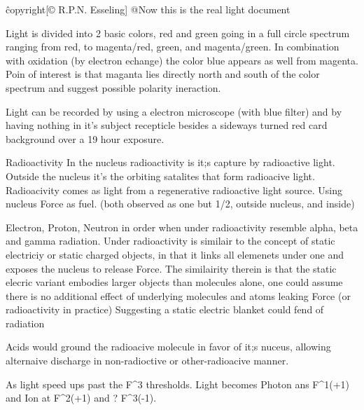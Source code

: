 \^copyright{[© R.P.N. Esseling]}
@Now this is the real light document

Light is divided into 2 basic colors, red and green going in a full circle spectrum ranging from red, to magenta/red, green, and magenta/green.
In combination with oxidation (by electron echange) the color blue appears as well from magenta. 
Poin of interest is that maganta lies directly north and south of the color spectrum and suggest possible polarity ineraction.

Light can be recorded by using a electron microscope (with blue filter) and by having nothing in it's subject recepticle besides a sideways turned red card background over a 19 hour exposure.

Radioactivity
In the nucleus radioactivity is it;s capture by radioactive light.
Outside the nucleus it's the orbiting satalites that form radioacive light. 
Radioacivity comes as light from a regenerative radioactive light source. Using nucleus Force as fuel.
(both observed as one but 1/2, outside nucleus, and inside)

Electron, Proton, Neutron in order when under radioactivity resemble alpha, beta and gamma radiation.
Under radioactivity is similair to the concept of static electriciy or static charged objects, in that it links all elemenets under one and exposes the nucleus to release Force.
The similairity therein is that the static elecric variant embodies larger objects than molecules alone, one could assume there is  no additional effect of underlying molecules and atoms leaking Force (or radioactivity in practice)
Suggesting a static electric blanket could fend of radiation

Acids would ground the radioacive molecule in favor of it;s nuceus, allowing alternaive discharge in non-radioctive or other-radioacive manner.

As light speed ups past the F^3 thresholds. Light becomes Photon ans F^1(+1) and Ion at F^2(+1) and ? F^3(-1). 

